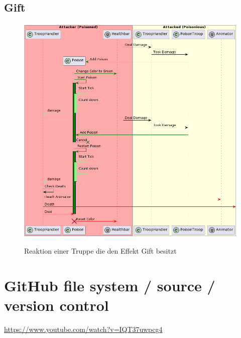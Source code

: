 \subsection{Gift}
\begin{figure}[H]
    \centering
    \includegraphics[width=15cm]{resources/Poison.png} \\
    \caption{Reaktion einer Truppe die den Effekt Gift besitzt}
\end{figure}


\section{GitHub file system / source / version control}
\url{https://www.youtube.com/watch?v=IQT37uwpcg4}